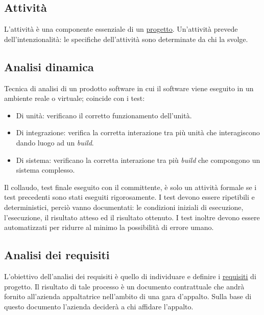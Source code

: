 





\copertina


\tableofcontents

\newpage
	\subsection{Attività}
	\label{sec:attivita}
	L'attività è una componente essenziale di un \underline{\hyperref[sec:progetto]{progetto}}. Un'attività prevede dell'intenzionalità: le specifiche dell'attività sono determinate da chi la svolge. 	
	
	\subsection{Analisi dinamica}
	\label{sec:analisidinamica}
	Tecnica di analisi di un prodotto software in cui il software viene eseguito in un ambiente reale o virtuale; coincide con i test: 
	\begin{itemize}  
		\item Di unità: verificano il corretto funzionamento dell'unità.
		\item Di integrazione: verifica la corretta interazione tra più unità che interagiscono dando luogo ad un \emph{build}.
		\item Di sistema: verificano la corretta interazione tra più \emph{build} che compongono un sistema complesso.
	\end{itemize}	
	Il collaudo, test finale eseguito con il committente, è solo un attività formale se i test precedenti sono stati eseguiti rigorosamente. I test devono essere ripetibili e deterministici, perciò vanno documentati: le condizioni iniziali di esecuzione, l'esecuzione, il risultato atteso ed il risultato ottenuto. I test inoltre devono essere automatizzati per ridurre al minimo la possibilità di errore umano.
	
	\subsection{Analisi dei requisiti}
	\label{sec:analisirequisiti}
	L'obiettivo dell'analisi dei requisiti è quello di individuare e definire i \underline{\hyperref[sec:reqisito]{requisiti}} di progetto. Il risultato di tale processo è un documento contrattuale che andrà fornito all'azienda appaltatrice nell'ambito di una gara d'appalto. Sulla base di questo documento l'azienda deciderà a chi affidare l'appalto.
	
